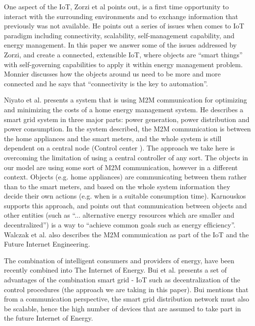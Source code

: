 \documentclass[../main/IoT.tex]{subfiles}
\begin{document}
One aspect of the IoT, Zorzi et al \cite{zorzi2010today} points out, is a first time opportunity to interact with the surrounding environments and to exchange information that previously was not available. He points out a series of issues when comes to IoT paradigm including connectivity, scalability, self-management capability, and energy management. In this paper we answer some of the issues addressed by Zorzi, and create a connected, extensible IoT, where objects are ``smart things'' with self-governing capabilities to apply it within energy management problem. Monnier \cite{whitePaper} discusses how the objects around us need to be more and more connected and he says that ``connectivity is the key to automation''.

Niyato et al. \cite{niyato2011machine} presents a system that is using M2M communication for optimizing and minimizing the costs of a home energy management system. He describes a smart grid system in three major parts: power generation, power distribution and power consumption. In the system described, the M2M communication is between the home appliances and the smart meters, and the whole system is still dependent on a central node (Control center \cite{niyato2011machine}). The approach we take here is overcoming the limitation of using a central controller of any sort. The objects in our model are using some sort of M2M communication, however in a different context. Objects (e.g. home appliances) are communicating between them rather than to the smart meters, and based on the whole system information they decide their own actions (e.g. when is a suitable consumption time). Karnouskos \cite{karnouskos2010cooperative} supports this approach, and points out that communication between objects and other entities (such as ``... alternative energy resources which are smaller and decentralized'') is a way to ``achieve common goals such as energy efﬁciency''. Walczak et al. \cite{walczak2012machine} also describes the M2M communication as part of the IoT and the Future Internet Engineering.

The combination of intelligent consumers and providers of energy, have been recently combined into The Internet of Energy. Bui et al. \cite{bui2012internet} presents a set of advantages of the combination smart grid - IoT such as decentralization of the control procedures (the approach we are taking in this paper). Bui mentions that from a communication perspective, the smart grid distribution network must also be scalable, hence the high number of devices that are assumed to take part in the future Internet of Energy.
\end{document}
